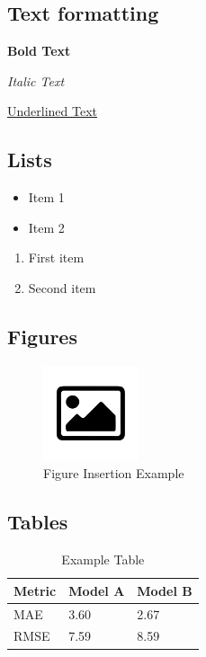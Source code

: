\subsection{Text formatting}\label{subsec:text-formatting}
\textbf{Bold Text}

\textit{Italic Text}

\underline{Underlined Text}

\subsection{Lists}\label{subsec:lists}
\begin{itemize}
    \item Item 1
    \item Item 2
\end{itemize}

\begin{enumerate}
    \item First item
    \item Second item
\end{enumerate}

\subsection{Figures}\label{subsec:figures}
\begin{figure}[htbp]
    \centering
    \includegraphics[width=0.25\textwidth]{images/default}
    \caption{
        Figure Insertion Example
    }
    \label{fig:figure-insertion-example}
\end{figure}

\subsection{Tables}\label{subsec:tables}
\begin{table}[htbp]
    \caption{
        Example Table
    }
    \center
    \begin{tabular}{@{}lll@{}}
        \toprule
        \textbf{Metric} & \textbf{Model A} & \textbf{Model B} \\
        \midrule
        MAE             & 3.60           & 2.67                   \\
        RMSE            & 7.59           & 8.59                   \\
        \bottomrule
    \end{tabular}
    \label{tab:example-table}
\end{table}


